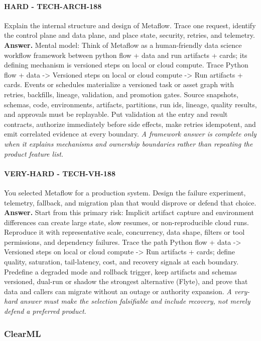 \paragraph{HARD - TECH-ARCH-188} Explain the internal structure and design of Metaflow. Trace one request, identify the control plane and data plane, and place state, security, retries, and telemetry.
\textbf{Answer.} Mental model: Think of Metaflow as a human-friendly data science workflow framework between python flow + data and run artifacts + cards; its defining mechanism is versioned steps on local or cloud compute. Trace Python flow + data -> Versioned steps on local or cloud compute -> Run artifacts + cards. Events or schedules materialize a versioned task or asset graph with retries, backfills, lineage, validation, and promotion gates. Source snapshots, schemas, code, environments, artifacts, partitions, run ids, lineage, quality results, and approvals must be replayable. Put validation at the entry and result contracts, authorize immediately before side effects, make retries idempotent, and emit correlated evidence at every boundary.
\textit{A framework answer is complete only when it explains mechanisms and ownership boundaries rather than repeating the product feature list.}
\paragraph{VERY-HARD - TECH-VH-188} You selected Metaflow for a production system. Design the failure experiment, telemetry, fallback, and migration plan that would disprove or defend that choice.
\textbf{Answer.} Start from this primary risk: Implicit artifact capture and environment differences can create large state, slow resumes, or non-reproducible cloud runs. Reproduce it with representative scale, concurrency, data shape, filters or tool permissions, and dependency failures. Trace the path Python flow + data -> Versioned steps on local or cloud compute -> Run artifacts + cards; define quality, saturation, tail-latency, cost, and recovery signals at each boundary. Predefine a degraded mode and rollback trigger, keep artifacts and schemas versioned, dual-run or shadow the strongest alternative (Flyte), and prove that data and callers can migrate without an outage or authority expansion.
\textit{A very-hard answer must make the selection falsifiable and include recovery, not merely defend a preferred product.}
\subsubsection*{ClearML}
